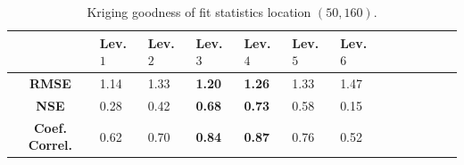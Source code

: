 \documentclass[10pt,letterpaper,conference]{ieeeconf}
\begin{document}
\begin{table}[t] 
\caption{Kriging goodness of fit statistics location $(50,160)$.}
\vspace*{-0.15in}
\label{table:Krig_goddness_50_160}
\vskip4mm
\centering
\begin{tabularx}{\columnwidth}{@{}>{\bfseries}c*{12}{X}@{}}
\hline \hline
 & Lev. $1$ & Lev. $2$ & Lev. $3$ & Lev. $4$ & Lev. $5$ & Lev. 
$6$ \\
\hline \hline
RMSE & 1.14&1.33&{\bf 1.20}& {\bf 1.26}&1.33&1.47\\
\hline
NSE & 0.28&0.42&{\bf 0.68}&{\bf 0.73}&0.58&0.15 \\
\hline
Coef. Correl. &0.62&0.70&{ \bf 0.84}& {\bf 0.87}&0.76&0.52 \\
\hline
\end{tabularx}
\end{table}
\end{document}
